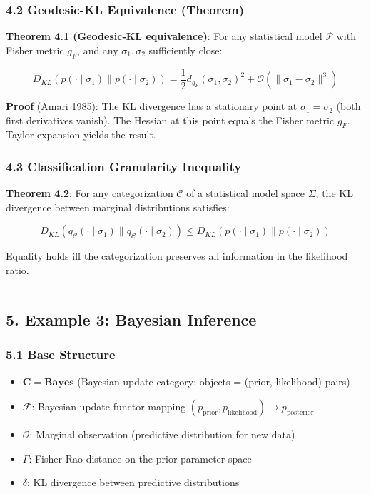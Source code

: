 \documentclass[
]{article}
\providecommand{\tightlist}{%
  \setlength{\itemsep}{0pt}\setlength{\parskip}{0pt}}
\begin{document}
\subsubsection{4.2 Geodesic-KL Equivalence
(Theorem)}\label{geodesic-kl-equivalence-theorem}

\textbf{Theorem 4.1 (Geodesic-KL equivalence)}: For any statistical
model \(\mathcal{P}\) with Fisher metric \(g_F\), and any
\(\sigma_1, \sigma_2\) sufficiently close:

\[D_{KL}(p(\cdot \mid \sigma_1) \parallel p(\cdot \mid \sigma_2)) = \frac{1}{2} d_{g_F}(\sigma_1, \sigma_2)^2 + \mathcal{O}(\|\sigma_1 - \sigma_2\|^3)\]

\textbf{Proof} (Amari 1985): The KL divergence has a stationary point at
\(\sigma_1 = \sigma_2\) (both first derivatives vanish). The Hessian at
this point equals the Fisher metric \(g_F\). Taylor expansion yields the
result.

\subsubsection{4.3 Classification Granularity
Inequality}\label{classification-granularity-inequality}

\textbf{Theorem 4.2}: For any categorization \(\mathcal{C}\) of a
statistical model space \(\Sigma\), the KL divergence between marginal
distributions satisfies:

\[D_{KL}(q_{\mathcal{C}}(\cdot \mid \sigma_1) \parallel q_{\mathcal{C}}(\cdot \mid \sigma_2)) \leq D_{KL}(p(\cdot \mid \sigma_1) \parallel p(\cdot \mid \sigma_2))\]

Equality holds iff the categorization preserves all information in the
likelihood ratio.

\begin{center}\rule{0.5\linewidth}{0.5pt}\end{center}

\subsection{5. Example 3: Bayesian
Inference}\label{example-3-bayesian-inference}

\subsubsection{5.1 Base Structure}\label{base-structure-2}

\begin{itemize}
\tightlist
\item
  \(\mathbf{C} = \mathbf{Bayes}\) (Bayesian update category: objects =
  (prior, likelihood) pairs)
\item
  \(\mathcal{F}\): Bayesian update functor mapping
  \((p_{\text{prior}}, p_{\text{likelihood}}) \to p_{\text{posterior}}\)
\item
  \(\mathcal{O}\): Marginal observation (predictive distribution for new
  data)
\item
  \(\Gamma\): Fisher-Rao distance on the prior parameter space
\item
  \(\delta\): KL divergence between predictive distributions
\end{itemize}
\end{document}
